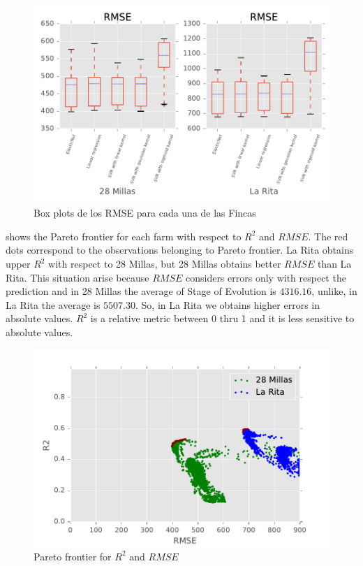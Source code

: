 %
\begin{figure}[H] 
 \centering
 \includegraphics[width=1.0\linewidth]{Usado_2017-04-30_Sigatoka_RMSE_Boxplot_4}
 \caption{Box plots de los RMSE para cada una de las Fincas} 
 \label{figura4} 
\end{figure}
%
 shows the Pareto frontier for each farm with respect to $R^2$ and $RMSE$. The red dots correspond to the observations belonging to Pareto frontier. La Rita obtains upper $R^2$ with respect to 28 Millas, but 28 Millas obtains better $RMSE$ than La Rita. This situation arise because $RMSE$ considers errors only with respect the prediction and in 28 Millas the average of Stage of Evolution is $4316.16$, unlike, in La Rita the average is $5507.30$. So, in La Rita we obtains higher errors in absolute values. $R^2$  is a relative metric between 0 thru 1 and it is less sensitive to absolute values.
%
\begin{figure}[H] 
 \centering
 \includegraphics[width=1.0\linewidth]{Usado_2017-04-30_Sigatoka_R2_RMSE}
 \caption{Pareto frontier for $R^2$ and $RMSE$} 
 \label{figura5} 
\end{figure}


